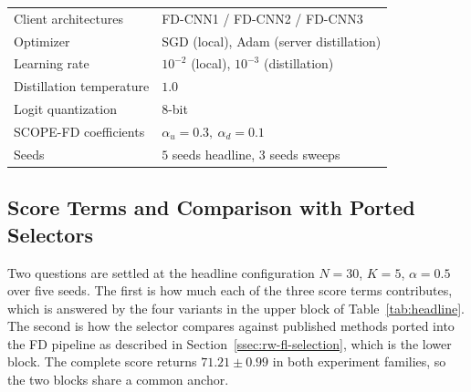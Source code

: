 \documentclass[journal]{IEEEtran}
\newcommand{\rev}[1]{#1}
\begin{document}
\begin{table}[t]
\begin{tabular}{@{}>{\raggedright\arraybackslash}m{}>{\raggedright\arraybackslash}m{}@{}}
Client architectures & FD-CNN1 / FD-CNN2 / FD-CNN3 \\
Optimizer & SGD (local), Adam (server distillation) \\
Learning rate & $10^{-2}$ (local), $10^{-3}$ (distillation) \\
Distillation temperature & $1.0$ \\
Logit quantization & $8$-bit \\
SCOPE-FD coefficients & $\alpha_u = 0.3,\ \alpha_d = 0.1$ \\
\rev{Seeds} & \rev{$5$ seeds headline, $3$ seeds sweeps} \\
\bottomrule
\end{tabular}
\end{table}

\subsection{Score Terms and Comparison with Ported Selectors}
\label{ssec:exp-ablation}

\rev{Two questions are settled at the headline configuration $N=30$, $K=5$, $\alpha=0.5$ over five seeds. The first is how much each of the three score terms contributes, which is answered by the four variants in the upper block of Table~\ref{tab:headline}. The second is how the selector compares against published methods ported into the FD pipeline as described in Section~\ref{ssec:rw-fl-selection}, which is the lower block. The complete score returns $71.21 \pm 0.99$ in both experiment families, so the two blocks share a common anchor.}
\end{document}
